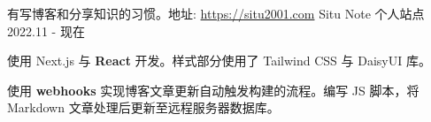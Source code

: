 \begin{cventries}

    \cventry
    {有写博客和分享知识的习惯。地址: \href{https://situ2001.com}{https://situ2001.com}} %
    {Situ Note 个人站点} %
    {} %
    {2022.11 - 现在} %
    {
        \begin{cvitems} %
            \item {使用 Next.js 与 \textbf{React} 开发。样式部分使用了 Tailwind CSS 与 DaisyUI 库。}
            \item {使用 \textbf{webhooks} 实现博客文章更新自动触发构建的流程。编写 JS 脚本，将 Markdown 文章处理后更新至远程服务器数据库。}
        \end{cvitems}
    }

\end{cventries}
